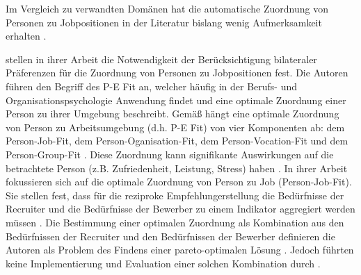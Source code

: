 Im Vergleich zu verwandten Domänen hat die automatische Zuordnung von Personen zu Jobpositionen in der Literatur bislang wenig Aufmerksamkeit erhalten \cite[S. 1469]{yildirim:article}.

\textcite[S. 1ff.]{malinowski:2006} stellen in ihrer Arbeit die Notwendigkeit der Berücksichtigung bilateraler Präferenzen für die Zuordnung von Personen zu Jobpositionen fest.
Die Autoren führen den Begriff des \ac{P-E Fit} an, welcher häufig in der Berufs- und Organisationspsychologie Anwendung findet \cite[S. 2]{link:booklet} und eine optimale Zuordnung einer Person zu ihrer Umgebung beschreibt.
Gemäß \textcite[S. 1ff.]{malinowski:2006} hängt eine optimale Zuordnung von Person zu Arbeitsumgebung (d.h. \ac{P-E Fit}) von vier Komponenten ab: dem Person-Job-Fit, dem Person-Oganisation-Fit, dem Per\-son-Vocation-Fit und dem Person-Group-Fit \cite[S. 3]{malinowski:2006}.
Diese Zuordnung kann signifikante Auswirkungen auf die betrachtete Person (z.B. Zufriedenheit, Leistung, Stress) haben \cite[S. 83]{su:2015}.
In ihrer Arbeit fokussieren sich \textcite[S. 4]{malinowski:2006} auf die optimale Zuordnung von Person zu Job (Person-Job-Fit).
Sie stellen fest, dass für die reziproke Empfehlungerstellung die Bedürfnisse der Recruiter und die Bedürfnisse der Bewerber zu einem Indikator \cite[S. 922]{siting:2012} aggregiert werden müssen \cite[S. 5]{malinowski:2006}.
Die Bestimmung einer optimalen Zuordnung als Kombination aus den Bedürfnissen der Recruiter und den Bedürfnissen der Bewerber definieren die Autoren als Problem des Findens einer pareto-optimalen Lösung \cite[S. 5]{malinowski:2006}.
Jedoch führten \textcite[S. 1ff.]{malinowski:2006} keine Implementierung und Evaluation einer solchen Kombination durch \cite[S. 549]{koprinska:inbook}.

